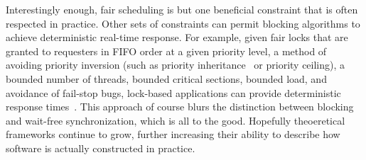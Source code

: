 Interestingly enough, fair scheduling is but one beneficial
constraint that is often respected in practice.
Other sets of constraints can permit blocking algorithms to
achieve deterministic real-time response.
For example, given fair locks that are granted to requesters in FIFO order at
a given priority level,
a method of avoiding priority inversion (such as priority
inheritance~\cite{Takada:1995:RSN:527074.828566,Cai-DongWang1996PrioInherLock}
or priority ceiling), a bounded number of threads,
bounded critical sections,
bounded load,
and avoidance of fail-stop bugs,
lock-based applications can provide deterministic
response times~\cite{BjoernBrandenburgPhD}.
This approach of course blurs the distinction between blocking and wait-free
synchronization, which is all to the good.
Hopefully theoeretical frameworks continue to grow, further increasing
their ability to
describe how software is actually constructed in practice.
